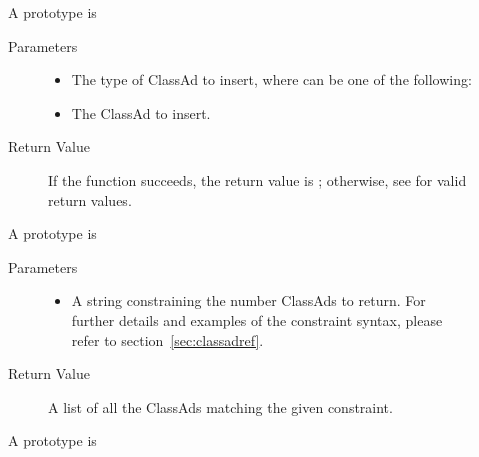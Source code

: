 
\begin{description}
\item []
  A prototype is 


  \begin{description}
    \item[ Parameters]
    \begin{itemize}
      \item {}
      The type of ClassAd to insert, where  can be one of the
      following:


      \item {} The ClassAd to insert.
    \end{itemize}
    \item[ Return Value]
      If the function succeeds, the return value is ; 
      otherwise, see  for valid return values.
  \end{description}

\item []
  A prototype is 


  \begin{description}
    \item[ Parameters]
    \begin{itemize}
      \item {} 
      A string constraining the number ClassAds to return. For further details 
      and examples of the constraint syntax, please refer to 
      section~\ref{sec:classadref}.
    \end{itemize}
    \item[ Return Value]
      A list of all the  ClassAds matching the 
      given constraint.
  \end{description}    

\item []
  A prototype is 


\end{description}
